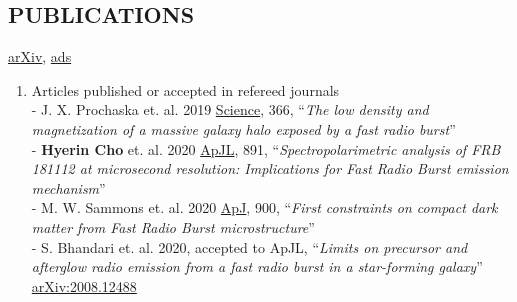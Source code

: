 \documentclass[margin, 10pt]{res} %
\begin{document}
\begin{resume}

\section{PUBLICATIONS}
\href{https://arxiv.org/search/advanced?advanced=&terms-0-operator=AND&terms-0-term=Hyerin+Cho&terms-0-field=author&classification-physics_archives=all&classification-include_cross_list=include&date-filter_by=all_dates&date-year=&date-from_date=&date-to_date=&date-date_type=submitted_date&abstracts=show&size=50&order=-announced_date_first}{arXiv}, \href{https://ui.adsabs.harvard.edu/search/q=orcid\%3A\%220000-0002-2858-9481\%22&sort=date\%20desc\%2C\%20bibcode\%20desc&p_=0}{ads}
\begin{enumerate}
    \item Articles published or accepted in refereed journals\\
    - J. X. Prochaska et. al. 2019 \href{https://science.sciencemag.org/content/366/6462/231/tab-pdf}{Science}, 366, ``{\sl The low density and magnetization of a massive galaxy halo exposed by a fast radio burst}''\\
    - \textbf{Hyerin Cho} et. al. 2020 \href{https://iopscience.iop.org/article/10.3847/2041-8213/ab7824/pdf}{ApJL}, 891, ``{\sl Spectropolarimetric analysis of FRB\,181112 at microsecond resolution: Implications for Fast Radio Burst emission mechanism}''\\
    - M. W. Sammons et. al. 2020 \href{https://iopscience.iop.org/article/10.3847/1538-4357/aba7bb}{ApJ}, 900, ``{\sl First constraints on compact dark matter from Fast Radio Burst microstructure}''\\
    - S. Bhandari et. al. 2020, accepted to ApJL, ``{\sl Limits on precursor and afterglow radio emission from a fast radio burst in a star-forming galaxy}'' \href{https://arxiv.org/abs/2008.12488}{arXiv:2008.12488}
    

\end{enumerate}
\end{resume}
\end{document}
